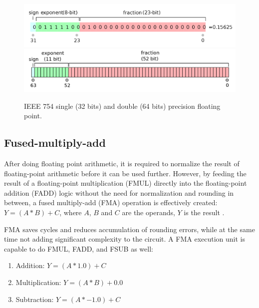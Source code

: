\documentclass[logo,bsc,singlespacing,parskip]{infthesis}
\newenvironment{compactlist}
{ \begin{enumerate}
    \setlength{\itemsep}{0pt}
    \setlength{\parskip}{0pt}
    \setlength{\parsep}{0pt}     
}
{ \end{enumerate} }
\begin{document}
\begin{figure}
    \includegraphics[width=\linewidth]{image/ieee-f32.png}
    \includegraphics[width=\linewidth]{image/ieee-f64.png}
    \caption{IEEE 754 single (32 bits) and double (64 bits) precision floating
    point. \cite{ieee754-diagram}}
    \label{fig:ieee-f32}
\end{figure}

\subsection{Fused-multiply-add}
\label{sec:FMA}

After doing floating point arithmetic, it is required to normalize the result of
floating-point arithmetic before it can be used further. However, by feeding the
result of a floating-point multiplication (FMUL) directly into the
floating-point addition (FADD) logic without the need for normalization and
rounding in between, a fused multiply-add (FMA) operation is effectively
created: 
\begin{math}Y = (A * B) + C \end{math}, where 
\begin{math}A\end{math},
\begin{math}B\end{math} and
\begin{math}C\end{math} are the operands, 
 \begin{math}Y\end{math} is the result \cite{CARD}.

FMA saves cycles and reduces accumulation of rounding errors, while at the same
time not adding significant complexity to the circuit. A FMA execution unit is
capable to do FMUL, FADD, and FSUB as well: 
\begin{compactlist} 
\item[] Addition: \begin{math}Y = (A * 1.0) + C \end{math} 
\item[] Multiplication: \begin{math} Y = (A * B) + 0.0 \end{math} 
\item[] Subtraction: \begin{math} Y = (A * -1.0) + C\end{math} 
\end{compactlist} 
\end{document}
